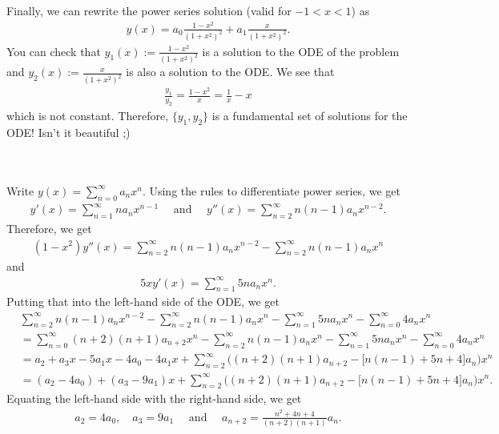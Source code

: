 \documentclass[12pt]{article}
\newcommand{\exo}[3]{\noindent\textcolor{red}{\fbox{\textbf{Section {#1} | Problem {#2} | {#3} points}}}\\}
\begin{document}
	Finally, we can rewrite the power series solution (valid for $-1 < x < 1$) as
		\begin{align*}
		y(x) = a_0 \frac{1 - x^2}{(1 + x^2)^2} + a_1  \frac{x}{(1 + x^2)^2} .
		\end{align*}
	You can check that $y_1 (x) := \frac{1 - x^2}{(1 + x^2)^2}$ is a solution to the ODE of the problem and $y_2 (x) := \frac{x}{(1 + x^2)^2}$ is also a solution to the ODE. We see that
		\begin{align*}
		\frac{y_1}{y_2} = \frac{1- x^2}{x} = \frac{1}{x} - x
		\end{align*}
	which is not constant. Therefore, $\{ y_1 , y_2 \}$ is a fundamental set of solutions for the ODE! Isn't it beautiful ;)
	
	\newpage
	
	\exo{7.2}{7}{25}
	\\
	Write $y(x) = \sum_{n = 0}^\infty a_n x^n$. Using the rules to differentiate power series, we get
		\begin{align*}
		y' (x) = \sum_{n = 1}^\infty n a_n x^{n-1} \quad \text{ and } \quad y'' (x) = \sum_{n = 2}^\infty n (n - 1) a_n x^{n - 2} .
		\end{align*}
	Therefore, we get
		\begin{align*}
		(1 - x^2) y'' (x) = \sum_{n = 2}^\infty n (n - 1) a_n x^{n - 2} - \sum_{n = 2}^\infty n (n - 1) a_n x^n
		\end{align*}
	and
		\begin{align*}
		5x y' (x) = \sum_{n = 1}^\infty 5n a_n x^n .
		\end{align*}
	Putting that into the left-hand side of the ODE, we get
		\begin{align*}
		& \sum_{n = 2}^\infty n (n - 1) a_n x^{n - 2} - \sum_{n = 2}^\infty n (n - 1) a_n x^n - \sum_{n = 1}^\infty 5n a_n x^n  - \sum_{n = 0}^\infty 4a_n x^n \\
		& = \sum_{n = 0}^\infty (n + 2) (n + 1) a_{n + 2} x^n - \sum_{n = 2}^\infty n (n - 1) a_n x^n - \sum_{n = 1}^\infty 5n a_n x^n - \sum_{n = 0}^\infty 4a_n x^n \\
		& = a_2 + a_3 x - 5a_1 x - 4a_0 - 4a_1 x + \sum_{n = 2}^\infty \Big( (n + 2) (n + 1) a_{n + 2} - \big[ n ( n -1) + 5n + 4 \big] a_n \Big) x^n \\
		& = (a_2 - 4a_0) + (a_3 - 9 a_1)x + \sum_{n = 2}^\infty \Big( (n + 2) (n + 1) a_{n + 2} - \big[ n ( n -1) + 5n + 4 \big] a_n \Big) x^n .
		\end{align*}
	Equating the left-hand side with the right-hand side, we get
		\begin{align*}
		a_2 = 4 a_0 , \quad a_3 = 9 a_1 \quad \text{ and } \quad a_{n + 2} = \frac{n^2 + 4n + 4}{(n + 2)(n + 1)} a_{n} .
		\end{align*}
\end{document}
